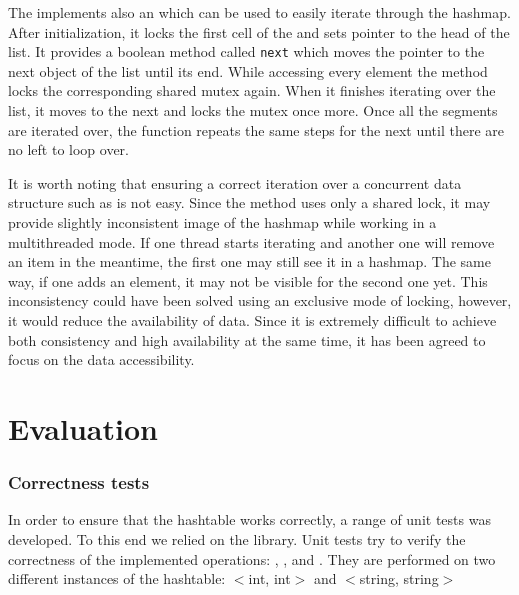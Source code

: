         The \NvmHashMap implements also an \Iterator which can be used to easily iterate through the hashmap.
        After initialization, it locks the first cell of the \ArrayOfSegments and sets pointer to the head of the list.
        It provides a boolean method called \texttt{next} which moves the pointer to the next object of the list until its end. 
        While accessing every element the method locks the corresponding shared mutex again. 
        When it finishes iterating over the list, it moves to the next \Segment and locks the mutex once more. 
        Once all the segments are iterated over, the function repeats the same steps for the next \ArrayOfSegments until there are no left to loop over.
        
        It is worth noting that ensuring a correct iteration over a concurrent data structure such as \NvmHashMap is not easy. 
        Since the \iterateMethod method uses only a shared lock, it may provide slightly inconsistent image of the hashmap while working in a multithreaded mode.
        If one thread starts iterating and another one will remove an item in the meantime, the first one may still see it in a hashmap. 
        The same way, if one adds an element, it may not be visible for the second one yet. 
        This inconsistency could have been solved using an exclusive mode of locking, however, it would reduce the availability of data. 
        Since it is extremely difficult to achieve both consistency and high availability at the same time, it has been agreed to focus on the data accessibility.

\section{Evaluation}

    \subsubsection{Correctness tests}
        In order to ensure that the hashtable works correctly, a range of unit tests was developed. 
        To this end we relied on the \GoogleTest library.
        Unit tests try to verify the correctness of the implemented operations: \insertMethod, \getMethod, \removeMethod and \iterateMethod. 
        They are performed on two different instances of the hashtable: $<$int, int$>$ and $<$string, string$>$ 
    
